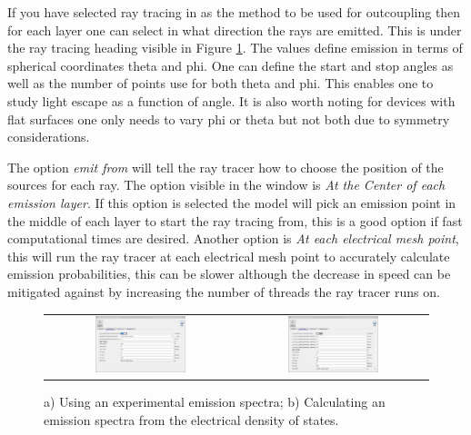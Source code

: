 If you have selected ray tracing in as the method to be used for outcoupling then for each layer one can select in what direction the rays are emitted. This is under the ray tracing heading visible in Figure \ref{fig:oled6}. The values define emission in terms of spherical coordinates theta and phi.  One can define the start and stop angles as well as the number of points use for both theta and phi. This enables one to study light escape as a function of angle. It is also worth noting for devices with flat surfaces one only needs to vary phi or theta but not both due to symmetry considerations.

The option \emph{emit from} will tell the ray tracer how to choose the position of the sources for each ray. The option visible in the window is \emph{At the Center of each emission layer}. If this option is selected the model will pick an emission point in the middle of each layer to start the ray tracing from, this is a good option if fast computational times are desired. Another option is \emph{At each electrical mesh point}, this will run the ray tracer at each electrical mesh point to accurately calculate emission probabilities, this can be slower although the decrease in speed can be mitigated against by increasing the number of threads the ray tracer runs on.

\begin{figure}[H]
\centering
\begin{tabular}{ c c }

\includegraphics[width=0.5\textwidth,height=0.4\textwidth]{./images/oled/experimental_emission.png}

&
\includegraphics[width=0.5\textwidth,height=0.4\textwidth]{./images/oled/optical_emisson_dos.png}

\\
\end{tabular}
\caption{a) Using an experimental emission spectra; b) Calculating an emission spectra from the electrical density of states.}
\label{fig:oled6}
\end{figure}

